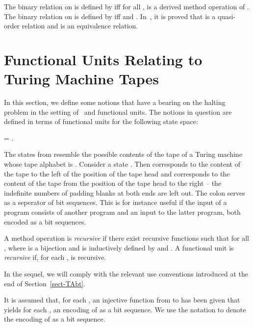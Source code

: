 \documentclass[fleqn]{llncs}
\begin{document}
The binary relation  on  is defined by
 iff for all ,  is a derived
method operation of .
The binary relation  on  is defined by
 iff  and .
In~\cite{BM09l}, it is proved that  is a quasi-order relation
and  is an equivalence relation.

\section{Functional Units Relating to Turing Machine Tapes}
\label{sect-func-unit-sbs}

In this section, we define some notions that have a bearing on the
halting problem in the setting of \PGLBbt\ and functional units.
The notions in question are defined in terms of functional units for the
following state space:
\begin{ldispl}
\SBS = \;.
\end{ldispl}

The states from  resemble the possible contents of the tape of a
Turing machine whose tape alphabet is .
Consider a state .
Then  corresponds to the content of the tape to the left of the
position of the tape head and  corresponds to the content of the tape
from the position of the tape head to the right -- the indefinite
numbers of padding blanks at both ends are left out.
The colon serves as a seperator of bit sequences.
This is for instance useful if the input of a program consists of
another program and an input to the latter program, both encoded as a
bit sequences.

A method operation  is \emph{recursive} if there exist
recursive functions  such that
 for all
,
where  is a bijection and
 is inductively defined by 
and .
A functional unit  is \emph{recursive} if, for each
,  is recursive.

In the sequel, we will comply with the relevant use conventions
introduced at the end of Section~\ref{sect-TAbt}.

It is assumed that, for each , an injective function
from  to  has been given that yields
for each , an encoding of  as a bit sequence.
We use the notation  to denote the encoding of  as a bit
sequence.
\end{document}
